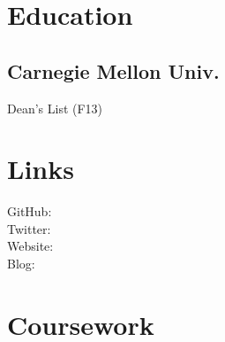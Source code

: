 \documentclass[]{deedy-resume-openfont}
\begin{document}
%
%

%
%



%
%

\begin{minipage}[t]{0.33\textwidth} 


\section{Education} 

\subsection{Carnegie Mellon Univ.}
Dean's List (F13) \\
\sectionsep


\section{Links} 
GitHub: \href{https://github.com/Z1MM32M4N}{} \\
Twitter:  \href{https://twitter.com/Z1MM32M4N}{} \\
Website:  \href{http://www.zimmerman.io}{} \\
Blog:  \href{http://blog.zimmerman.io}{} \\
\sectionsep


\section{Coursework}

\end{minipage}
\end{document}
